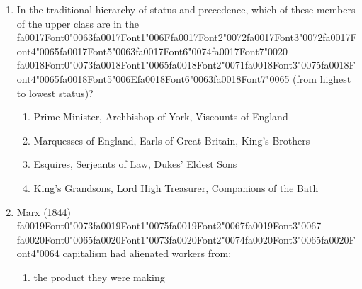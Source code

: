 \documentclass[12pt]{article}
\begin{document}
\begin{enumerate}[label=\arabic*.]
\begin{enumerate}[label=(\alph*)]
    \item the group of structural theories of society that he was reacting against
    \item the overall impression of ourselves that we try to give off to others
    \item a significant figure in early childhood who teaches us the general values of society
    \item an image of how people in the wider society might perceive our behaviour
\end{enumerate}
\item In the traditional hierarchy of status and precedence, which of these members of the upper class are in the {\csname fa0017Font0\endcsname\char"0063}{\csname fa0017Font1\endcsname\char"006F}{\csname fa0017Font2\endcsname\char"0072}{\csname fa0017Font3\endcsname\char"0072}{\csname fa0017Font4\endcsname\char"0065}{\csname fa0017Font5\endcsname\char"0063}{\csname fa0017Font6\endcsname\char"0074}{\csname fa0017Font7\endcsname\char"0020} {\csname fa0018Font0\endcsname\char"0073}{\csname fa0018Font1\endcsname\char"0065}{\csname fa0018Font2\endcsname\char"0071}{\csname fa0018Font3\endcsname\char"0075}{\csname fa0018Font4\endcsname\char"0065}{\csname fa0018Font5\endcsname\char"006E}{\csname fa0018Font6\endcsname\char"0063}{\csname fa0018Font7\endcsname\char"0065} (from highest to lowest status)?
\begin{enumerate}[label=(\alph*)]
    \item Prime Minister, Archbishop of York, Viscounts of England
    \item Marquesses of England, Earls of Great Britain, King's Brothers
    \item Esquires, Serjeants of Law, Dukes' Eldest Sons
    \item King's Grandsons, Lord High Treasurer, Companions of the Bath
\end{enumerate}
\item Marx (1844) {\csname fa0019Font0\endcsname\char"0073}{\csname fa0019Font1\endcsname\char"0075}{\csname fa0019Font2\endcsname\char"0067}{\csname fa0019Font3\endcsname\char"0067} {\csname fa0020Font0\endcsname\char"0065}{\csname fa0020Font1\endcsname\char"0073}{\csname fa0020Font2\endcsname\char"0074}{\csname fa0020Font3\endcsname\char"0065}{\csname fa0020Font4\endcsname\char"0064} capitalism had alienated workers from:
\begin{enumerate}[label=(\alph*)]
    \item the product they were making

\end{enumerate}
\end{enumerate}
\end{document}
